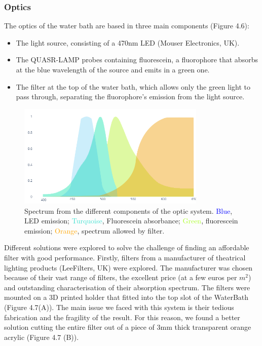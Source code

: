 \subsubsection{Optics}
The optics of the water bath are based in three main components (Figure 4.6):
\begin{itemize}
\item The light source, consisting of a 470nm LED (Mouser Electronics, UK).
\item The QUASR-LAMP probes containing fluorescein, a fluorophore that absorbs at the blue wavelength of the source and emits in a green one.
\item The filter at the top of the water bath, which allows only the green light to pass through, separating the fluorophore's emission from the light source. 
\end{itemize}
\vspace{12pt}
\begin{figure}[h]
    \centering
    \includegraphics[width=0.8\textwidth]{figures/wavelengths.png}
    \caption{Spectrum from the different components of the optic system. \textcolor{blue}{Blue}, LED emission; \textcolor{Turquoise}{Turquoise}, Fluorescein absorbance; \textcolor{GreenYellow}{Green}, fluorescein emission; \textcolor{Orange}{Orange}, spectrum allowed by filter.}
    \label{wavelengths}
\end{figure}
\vspace{12pt}

Different solutions were explored to solve the challenge of finding an affordable filter with good performance. Firstly, filters from a manufacturer of theatrical lighting products (LeeFilters, UK) were explored. The manufacturer was chosen because of their vast range of filters, the excellent price (at a few euros per $m^2$) and outstanding characterisation of their absorption spectrum. The filters were mounted on a 3D printed holder that fitted into the top slot of the WaterBath (Figure 4.7(A)). The main issue we faced with this system is their tedious fabrication and the fragility of the result. For this reason, we found a better solution cutting the entire filter out of a piece of 3mm thick transparent orange acrylic (Figure 4.7 (B)).

